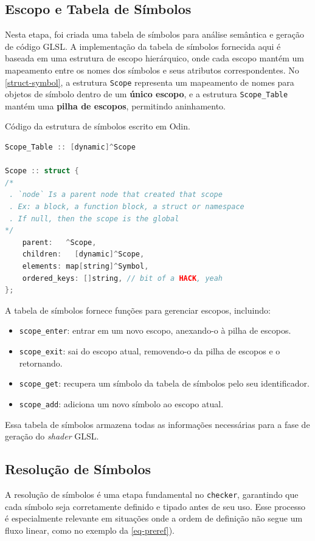 \subsection{Escopo e Tabela de Símbolos} \label{section-escope-table}


Nesta etapa, foi criada uma tabela de símbolos para análise semântica e geração de código GLSL. A implementação da tabela de símbolos fornecida aqui é baseada em uma estrutura de escopo hierárquico, onde cada escopo mantém um mapeamento entre os nomes dos símbolos e seus atributos correspondentes. No \autoref{struct-symbol}, a estrutura \texttt{Scope} representa um mapeamento de nomes para objetos de símbolo dentro de um \textbf{único escopo}, e a estrutura \texttt{Scope\_Table} mantém uma \textbf{pilha de escopos}, permitindo aninhamento.

\begin{codigo}[H]
\caption{\small Código da estrutura de símbolos escrito em Odin.}
\label{struct-symbol}
\begin{lstlisting}[language=C]
Scope_Table :: [dynamic]^Scope

Scope :: struct {
/*
 . `node` Is a parent node that created that scope
 . Ex: a block, a function block, a struct or namespace
 . If null, then the scope is the global
*/
    parent:   ^Scope,
    children:   [dynamic]^Scope,
    elements: map[string]^Symbol,
    ordered_keys: []string, // bit of a HACK, yeah
};

\end{lstlisting}
\end{codigo}

A tabela de símbolos fornece funções para gerenciar escopos, incluindo:
\begin{itemize}
    \item \texttt{scope\_enter}: entrar em um novo escopo, anexando-o à pilha de escopos.
    \item \texttt{scope\_exit}: sai do escopo atual, removendo-o da pilha de escopos e o retornando.
    \item \texttt{scope\_get}: recupera um símbolo da tabela de símbolos pelo seu identificador.
    \item \texttt{scope\_add}: adiciona um novo símbolo ao escopo atual.
\end{itemize}

Essa tabela de símbolos armazena todas as informações necessárias para a fase de geração do \textit{shader} GLSL.


\subsection{Resolução de Símbolos} \label{subsection-sym-resolution}
A resolução de símbolos é uma etapa fundamental no \texttt{checker}, garantindo que cada símbolo seja corretamente definido e tipado antes de seu uso. Esse processo é especialmente relevante em situações onde a ordem de definição não segue um fluxo linear, como no exemplo da \autoref{eq-preref}).


